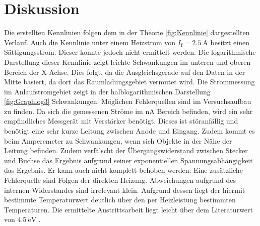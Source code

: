 
\section{Diskussion}
\label{sec:Diskussion}

Die erstellten Kennlinien folgen dem in der Theorie \ref{fig:Kennlinie} dargestellten Verlauf.
 Auch die Kennlinie unter einem Heizstrom von $I_\text{f} = \SI{2.5}{\ampere}$
 besitzt einen Sättigungsstrom. Dieser konnte jedoch nicht ermittelt werden.
Die logarithmische Darstellung dieser Kennlinie zeigt leichte Schwankungen im
unteren und oberen Bereich der X-Achse. Dies folgt, da die Ausgleichsgerade auf
den Daten in der Mitte basiert, da dort das Raumladungsgebiet vermutet wird.
Die Strommessung im Anlaufstromgebiet zeigt in der halblogarithmischen
Darstellung \ref{fig:Graphlog3} Schwankungen. Möglichen Fehlerquellen sind im
Versuchsaufbau zu finden. Da sich die gemessenen Ströme im $\si{\nano\ampere}$
Bereich befinden, wird ein sehr empfindliches Messgerät mit Verstärker benötigt.
Dieses ist störanfällig und benötigt eine sehr kurze Leitung zwischen Anode und Eingang.
Zudem kommt es beim Amperemeter zu Schwankungen, wenn sich Objekte in der Nähe der
Leitung befinden. Zudem verfälscht der Übergangswiderstand zwischen Stecker und
Buchse das Ergebnis aufgrund seiner exponentiellen Spannungsabhängigkeit das Ergebnis.
 Er kann auch nicht komplett behoben werden. Eine zusätzliche Fehlerquelle sind
 Folgen der direkten Heizung. Abweichungen aufgrund des internen Widerstandes
 sind irrelevant klein. Aufgrund dessen liegt der hiermit bestimmte Temperaturwert
 deutlich über den per Heizleistung bestimmten Temperaturen. Die ermittelte
 Austrittsarbeit liegt leicht über dem Literaturwert von $\SI{4.5}{\electronvolt}$ \cite{wolfaus}. 
